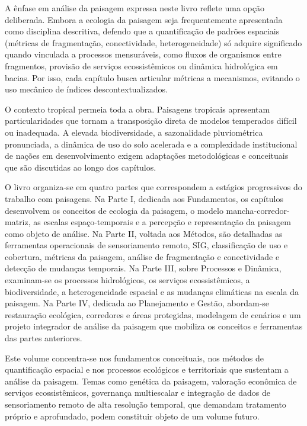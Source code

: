 \documentclass[
  portuguese,
  11pt,
  a4paper,
  open=any]{scrbook}
\begin{document}
A ênfase em análise da paisagem expressa neste livro reflete uma opção
deliberada. Embora a ecologia da paisagem seja frequentemente
apresentada como disciplina descritiva, defendo que a quantificação de
padrões espaciais (métricas de fragmentação, conectividade,
heterogeneidade) só adquire significado quando vinculada a processos
mensuráveis, como fluxos de organismos entre fragmentos, provisão de
serviços ecossistêmicos ou dinâmica hidrológica em bacias. Por isso,
cada capítulo busca articular métricas a mecanismos, evitando o uso
mecânico de índices descontextualizados.

O contexto tropical permeia toda a obra. Paisagens tropicais apresentam
particularidades que tornam a transposição direta de modelos temperados
difícil ou inadequada. A elevada biodiversidade, a sazonalidade
pluviométrica pronunciada, a dinâmica de uso do solo acelerada e a
complexidade institucional de nações em desenvolvimento exigem
adaptações metodológicas e conceituais que são discutidas ao longo dos
capítulos.

O livro organiza-se em quatro partes que correspondem a estágios
progressivos do trabalho com paisagens. Na Parte I, dedicada aos
Fundamentos, os capítulos desenvolvem os conceitos de ecologia da
paisagem, o modelo mancha-corredor-matriz, as escalas espaço-temporais e
a percepção e representação da paisagem como objeto de análise. Na Parte
II, voltada aos Métodos, são detalhadas as ferramentas operacionais de
sensoriamento remoto, SIG, classificação de uso e cobertura, métricas da
paisagem, análise de fragmentação e conectividade e detecção de mudanças
temporais. Na Parte III, sobre Processos e Dinâmica, examinam-se os
processos hidrológicos, os serviços ecossistêmicos, a biodiversidade, a
heterogeneidade espacial e as mudanças climáticas na escala da paisagem.
Na Parte IV, dedicada ao Planejamento e Gestão, abordam-se restauração
ecológica, corredores e áreas protegidas, modelagem de cenários e um
projeto integrador de análise da paisagem que mobiliza os conceitos e
ferramentas das partes anteriores.

Este volume concentra-se nos fundamentos conceituais, nos métodos de
quantificação espacial e nos processos ecológicos e territoriais que
sustentam a análise da paisagem. Temas como genética da paisagem,
valoração econômica de serviços ecossistêmicos, governança multiescalar
e integração de dados de sensoriamento remoto de alta resolução
temporal, que demandam tratamento próprio e aprofundado, podem
constituir objeto de um volume futuro.
\end{document}
